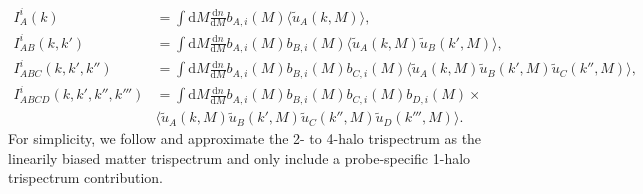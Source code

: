 \documentclass[a4paper,11pt]{article}
\begin{document}
\begin{align}
I^{i}_{A}(k) &= \int \mathrm{d}M \frac{\mathrm{d}n}{\mathrm{d}M} b_{A, i}(M) \langle \tilde{u}_{A}(k, M) \rangle, \\
I^{i}_{AB}(k, k') &= \int \mathrm{d}M \frac{\mathrm{d}n}{\mathrm{d}M} b_{A, i}(M) b_{B, i}(M) \langle \tilde{u}_{A}(k, M) \tilde{u}_{B}(k', M) \rangle, \\
I^{i}_{ABC}(k, k', k'') &= \int \mathrm{d}M \frac{\mathrm{d}n}{\mathrm{d}M} b_{A, i}(M) b_{B, i}(M) b_{C, i}(M) \langle \tilde{u}_{A}(k, M) \tilde{u}_{B}(k', M) \tilde{u}_{C}(k'', M) \rangle, \\
I^{i}_{ABCD}(k, k', k'', k''') &= \int \mathrm{d}M \frac{\mathrm{d}n}{\mathrm{d}M} b_{A, i}(M) b_{B, i}(M) b_{C, i}(M) b_{D, i}(M) \times \\ &\langle \tilde{u}_{A}(k, M) \tilde{u}_{B}(k', M) \tilde{u}_{C}(k'', M) \tilde{u}_{D}(k''', M) \rangle.
\end{align}
For simplicity, we follow \cite{Krause:2017} and approximate the 2- to 4-halo trispectrum as the linearily biased matter trispectrum and only include a probe-specific 1-halo trispectrum contribution.
\end{document}
